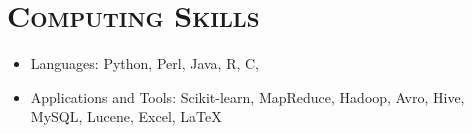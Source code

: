\begin{resume}
\begin{position}
\end{position}




\section{\textsc{Computing Skills}}
\begin{itemize}
\item Languages: Python, Perl, Java, R, C, \Cplusplus %
\item Applications and Tools: Scikit-learn, MapReduce, Hadoop, Avro, Hive, MySQL, Lucene, Excel, \LaTeX
\end{itemize}



\end{resume}
